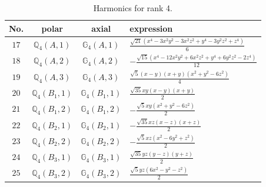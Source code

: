 \documentclass[fleqn,8pt,landscape]{jsarticle}
\begin{document}
\begin{table}[ht!]
\begin{center}
\caption{Harmonics for rank 4.}
\renewcommand{\arraystretch}{1.3}
\begin{tabular}{cccl} \hline \hline
No. & polar & axial & expression \\ \hline
$ 17 $ & $ \mathbb{Q}_{4}(A,1) $ & $ \mathbb{G}_{4}(A,1) $ & $ \frac{\sqrt{21} \left(x^{4} - 3 x^{2} y^{2} - 3 x^{2} z^{2} + y^{4} - 3 y^{2} z^{2} + z^{4}\right)}{6} $ \\
$ 18 $ & $ \mathbb{Q}_{4}(A,2) $ & $ \mathbb{G}_{4}(A,2) $ & $ - \frac{\sqrt{15} \left(x^{4} - 12 x^{2} y^{2} + 6 x^{2} z^{2} + y^{4} + 6 y^{2} z^{2} - 2 z^{4}\right)}{12} $ \\
$ 19 $ & $ \mathbb{Q}_{4}(A,3) $ & $ \mathbb{G}_{4}(A,3) $ & $ \frac{\sqrt{5} \left(x - y\right) \left(x + y\right) \left(x^{2} + y^{2} - 6 z^{2}\right)}{4} $ \\
$ 20 $ & $ \mathbb{Q}_{4}(B_{1},1) $ & $ \mathbb{G}_{4}(B_{1},1) $ & $ \frac{\sqrt{35} x y \left(x - y\right) \left(x + y\right)}{2} $ \\
$ 21 $ & $ \mathbb{Q}_{4}(B_{1},2) $ & $ \mathbb{G}_{4}(B_{1},2) $ & $ - \frac{\sqrt{5} x y \left(x^{2} + y^{2} - 6 z^{2}\right)}{2} $ \\
$ 22 $ & $ \mathbb{Q}_{4}(B_{2},1) $ & $ \mathbb{G}_{4}(B_{2},1) $ & $ - \frac{\sqrt{35} x z \left(x - z\right) \left(x + z\right)}{2} $ \\
$ 23 $ & $ \mathbb{Q}_{4}(B_{2},2) $ & $ \mathbb{G}_{4}(B_{2},2) $ & $ - \frac{\sqrt{5} x z \left(x^{2} - 6 y^{2} + z^{2}\right)}{2} $ \\
$ 24 $ & $ \mathbb{Q}_{4}(B_{3},1) $ & $ \mathbb{G}_{4}(B_{3},1) $ & $ \frac{\sqrt{35} y z \left(y - z\right) \left(y + z\right)}{2} $ \\
$ 25 $ & $ \mathbb{Q}_{4}(B_{3},2) $ & $ \mathbb{G}_{4}(B_{3},2) $ & $ \frac{\sqrt{5} y z \left(6 x^{2} - y^{2} - z^{2}\right)}{2} $ \\
 \hline \hline
\end{tabular}
\end{center}
\end{table}
\end{document}
